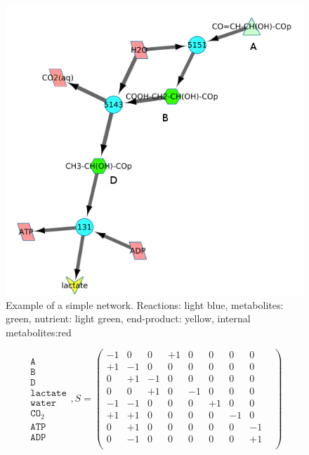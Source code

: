 \documentclass[a4paper,12pt]{article}
\begin{document}
\begin{figure}[htbp]
	\centering
	\includegraphics[width=0.5\linewidth]{initial_network_ABC.png}
	\caption{Example of a simple network. Reactions: light blue, metabolites: green, nutrient: light green, end-product: yellow, internal metabolites:red}
	\label{fig:examplenetwork}
\end{figure}

	\begin{equation}
	\begin{matrix}
		\texttt{A}   \\
		\texttt{B}\\
		\texttt{D}\\
		\texttt{lactate}\\
		\texttt{water}\\
		\texttt{CO}_2\\
		\texttt{ATP}\\
		\texttt{ADP}
	\end{matrix}
	,S=
	\begin{pmatrix}
			  -1 &  0 &  0 & +1 &  0 &  0 & 0 & 0 & \\ 
			  +1 & -1 &  0 &  0 &  0 &  0 & 0 &0 &  \\ 
			  0 & +1 & -1 &  0 &  0 &  0 & 0 & 0 & \\ 
			  0  &  0 & +1 &  0 & -1 &  0 & 0 & 0 & \\ 
			  -1 & -1 &  0 &  0 &  0 &+1  & 0 & 0 & \\ 
			  +1 & +1 &  0 &  0 &  0 &  0 & -1&0 &  \\ 
			  0 & +1 &  0 &  0 &  0 & 0 &0 & -1 &\\ 
			  0 & -1 &  0 &  0 &  0 & 0 &0 & +1 & \\ 
			  
		\end{pmatrix} 
		\label{eq:examplematrix}
	\end{equation}
\end{document}
